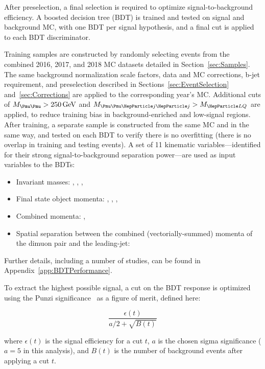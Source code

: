 
After preselection, a final selection is required to optimize signal-to-background efficiency. A boosted decision tree (BDT) is trained and tested on signal and background MC, with one BDT per signal hypothesis, and a final cut is applied to each BDT discriminator. 

Training samples are constructed by randomly selecting events from the combined 2016, 2017, and 2018 MC datasets detailed in Section~\ref{sec:Samples}. The same background normalization scale factors, data and MC corrections, b-jet requirement, and preselection described in Sections~\ref{sec:EventSelection} and~\ref{sec:Corrections} are applied to the corresponding year's MC. Additional cuts of $\Muu > \SI{250}{\GeV}$ and $\Muujj > \MLQ$ are applied, to reduce training bias in background-enriched and low-signal regions. After training, a separate sample is constructed from the same MC and in the same way, and tested on each BDT to verify there is no overfitting (there is no overlap in training and testing events). A set of 11 kinematic variables---identified for their strong signal-to-background separation power---are used as input variables to the BDTs: 
\begin{itemize}
    \item Invariant masses: \Muu, \Muujj, \MujOne, \MujTwo
    \item Final state object momenta: \ptof{\PmuOne}, \ptof{\PmuTwo}, \ptof{\PjOne}, \ptof{\PjTwo}
    \item Combined momenta: \ST, \MET
    \item Spatial separation between the combined (vectorially-summed) momenta of the dimuon pair and the leading-\pt jet: \DRof{\PmuOne+\PmuTwo}{\PjOne}
\end{itemize}
Further details, including a number of studies, can be found in Appendix~\ref{app:BDTPerformance}.

To extract the highest possible signal, a cut on the BDT response is optimized using the Punzi significance~\cite{Punzi} as a figure of merit, defined here:

\begin{equation}
    \frac{\epsilon(t)}{a/2+\sqrt{B(t)}}
    \label{eq:punzi}
\end{equation}

where $\epsilon(t)$ is the signal efficiency for a cut $t$, $a$ is the chosen sigma significance ($a = 5$ in this analysis), and $B(t)$ is the number of background events after applying a cut $t$.

